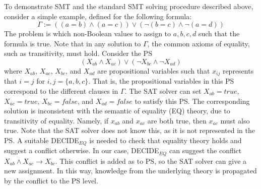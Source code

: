 \documentclass[review]{elsarticle}
\newcommand{\ps}{\ac{PS}\xspace}
\begin{document}
To demonstrate SMT and the standard SMT solving procedure described above, consider a simple example, defined for the following formula:
\begin{equation}
\Gamma := ((a = b) \wedge (a=c)) \vee (\neg(b = c) \wedge \neg(a=d))
\end{equation}
The problem is which non-Boolean values to assign to $a,b,c,d$ such that the formula is true. 
Note that in any solution to $\Gamma$, the common axioms of equality, such as transitivity, must hold. 
Consider the \ps  
\begin{equation}
 (X_{ab} \wedge X_{ac}) \vee (\neg X_{bc} \wedge \neg X_{ad})   
\end{equation}
where $X_{ab}$, $X_{ac}$, $X_{bc}$, and $X_{ad}$ are propositional variables such that $x_{ij}$ represents that $i=j$ for $i,j=\{a,b,c\}$. 
That is, the propositional variables in this \ps correspond to the different clauses in $\Gamma$. 
The SAT solver can set $X_{ab}=true$, $X_{ac}=true$, $X_{bc}=false$, and $X_{ad}=false$ to satisfy this \ps. %
The corresponding solution is inconsistent with the semantic of equality (EQ) theory, due to transitivity of equality. Namely, if $x_{ab}$ and $x_{ac}$ are both true, then $x_{ac}$ must also true. Note that the SAT solver does not know this, as it is not represented in the \ps. A suitable DECIDE$_{EQ}$ is needed to check that equality theory holds and suggest a conflict otherwise. In our case, DECIDE$_{EQ}$ can suggest the conflict $X_{ab} \wedge X_{ac} \rightarrow X_{bc}$. This conflict is added as to \ps, so the SAT solver can give a new assignment. %
In this way, knowledge from the underlying theory is propagated by the conflict to the \ps level.
\end{document}
